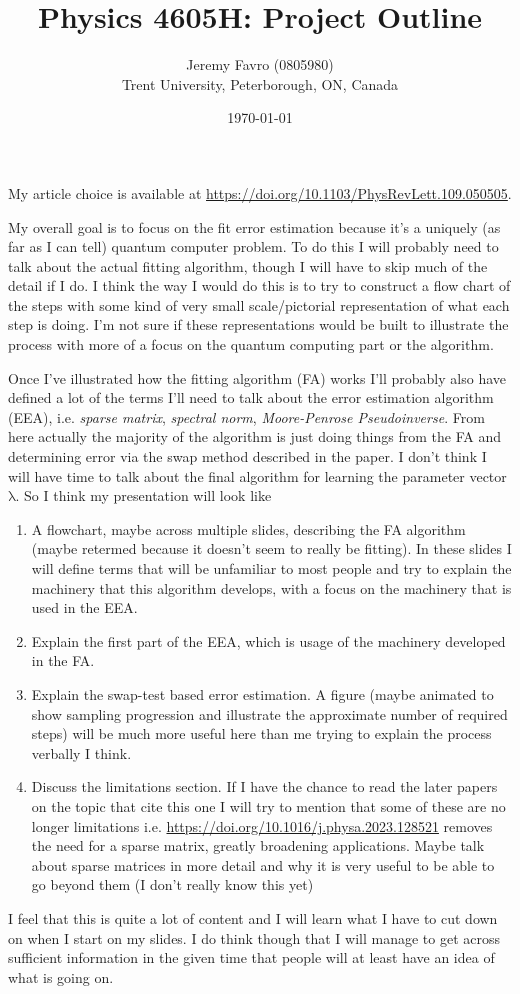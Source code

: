\documentclass[10pt]{article}
\title{Physics 4605H: Project Outline}
\author{Jeremy Favro (0805980) \\ Trent University, Peterborough, ON, Canada}
\date{\today}
\theoremstyle{definition}
\newcommand{\bv}[1]{\bm{\mathrm{#1}}}
\begin{document}
\maketitle
My article choice is available at \url{https://doi.org/10.1103/PhysRevLett.109.050505}.


My overall goal is to focus on the fit error estimation because it's a uniquely (as far as I can tell) quantum computer problem. To do this I will probably need
to talk about the actual fitting algorithm, though I will have to skip much of the detail if I do. I think the way I would do this is to
try to construct a flow chart of the steps with some kind of very small scale/pictorial representation of what each step is doing. I'm not sure if these representations
would be built to illustrate the process with more of a focus on the quantum computing part or the algorithm.

Once I've illustrated how the fitting algorithm (FA) works I'll probably also have defined a lot of the terms I'll need
to talk about the error estimation algorithm (EEA), i.e. \emph{sparse matrix}, \emph{spectral norm}, \emph{Moore-Penrose Pseudoinverse}. From here
actually the majority of the algorithm is just doing things from the FA and determining error via the swap method described in the paper.
I don't think I will have time to talk about the final algorithm for learning the parameter vector $\bv{\lambda}$. So I think my presentation will look like
\begin{enumerate}
  \item A flowchart, maybe across multiple slides, describing the FA algorithm (maybe retermed because it doesn't seem to really be fitting).
        In these slides I will define terms that will be unfamiliar to most people and try to explain the machinery that this algorithm develops, with a focus
        on the machinery that is used in the EEA.
  \item Explain the first part of the EEA, which is usage of the machinery developed in the FA.
  \item Explain the swap-test based error estimation. A figure (maybe animated to show sampling progression and illustrate the approximate number of required steps)
        will be much more useful here than me trying to explain the process verbally I think.
  \item Discuss the limitations section. If I have the chance to read the later papers on the topic that cite this one I will try to mention that some of
        these are no longer limitations i.e. \url{https://doi.org/10.1016/j.physa.2023.128521} removes the need for a sparse matrix, greatly broadening applications.
        Maybe talk about sparse matrices in more detail and why it is very useful to be able to go beyond them (I don't really know this yet)
\end{enumerate}
I feel that this is quite a lot of content and I will learn what I have to cut down on when I start on my slides. I do think though that I will manage
to get across sufficient information in the given time that people will at least have an idea of what is going on.
\end{document}
